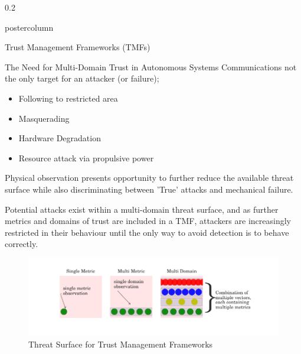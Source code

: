 \documentclass[final,hyperref={pdfpagelabels=false}]{beamer}
\def\colwidth{0.2\linewidth}
\begin{document}
\begin{frame}[fragile]
\begin{columns}[T]
\begin{column}{\colwidth}
\begin{beamercolorbox}[center,wd=\textwidth]{postercolumn}
\begin{minipage}[T]{.98\textwidth}
{\begin{block}{Trust Management Frameworks (TMFs)}
						\end{block}
						\begin{block}{The Need for Multi-Domain Trust in Autonomous Systems}
							Communications not the only target for an attacker (or failure);
							\begin{itemize}
								\item Following to restricted area
								\item Masquerading
								\item Hardware Degradation
								\item Resource attack via propulsive power
							\end{itemize}
							Physical observation presents opportunity to further reduce the available threat surface while also discriminating between 'True' attacks and mechanical failure.
							
							\vspace{0.3\baselineskip}
							
							Potential attacks exist within a multi-domain threat surface, and as further metrics and domains of trust are included in a TMF, attackers are increasingly restricted in their behaviour until the only way to avoid detection is to behave correctly.
							\begin{figure}[h]
								\centering
								\includegraphics[width=0.9\linewidth]{threat_surface_sum}
								\caption{Threat Surface for Trust Management Frameworks}
							\end{figure}
						\end{block}
						
}
\end{minipage}
\end{beamercolorbox}
\end{column}
\end{columns}
\end{frame}
\end{document}
